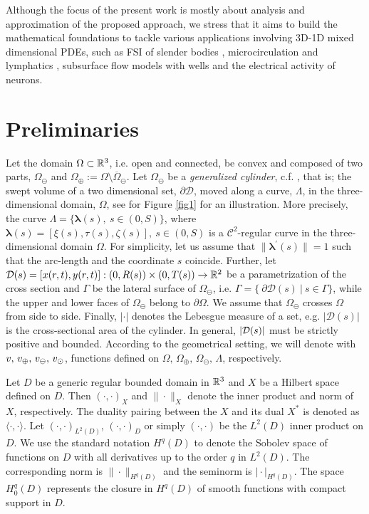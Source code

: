 \documentclass[r]{siamart171218}
\newcommand{\fede}[1]{{\color{green!55!blue}#1}}
\newcommand{\paoloold}[1]{{\color{black}#1}}
\begin{document}
\paoloold{Although the focus of the present work is mostly about analysis and approximation of the proposed approach, we stress that it aims to build the mathematical foundations to tackle various applications involving 3D-1D mixed dimensional PDEs, such as FSI of slender bodies \cite{Mori2019887}, microcirculation and lymphatics \cite{Possenti2019101,Vinje2019}, subsurface flow models with wells \cite{Cerroni2019} and the electrical activity of neurons.}

\section{Preliminaries}\label{sec:setting}
Let the domain $\Omega\subset \mathbb{R}^3 $\fede{, i.e. open and connected,} be convex and composed of two parts, 
$\Omega_{\ominus}$ and $\Omega_{\oplus}:=\Omega\setminus\overline{\Omega}_{\ominus}$. 
Let 
$\Omega_{\ominus}$ be a \emph{generalized cylinder}, c.f.  \cite{MR1940257}, 
that is; the swept volume of a two dimensional set, $\partial\mathcal{D}$, moved along a curve, $\Lambda$, in the three-dimensional domain, $\Omega$, see for Figure \ref{fig1} for an illustration. 
\fede{More precisely}, the curve 
$\Lambda = \{\boldsymbol \lambda(s), \ s\in(0,S)\}$,  where 
$\boldsymbol \lambda(s) = [\xi(s), \tau(s), \zeta(s)], \ s\in(0,S)$ is a $\mathcal{C}^2$-regular curve in the three-dimensional domain $\Omega$.
For simplicity, let us assume that $\|\boldsymbol \lambda^\prime(s)\|=1$ such that the arc-length and the coordinate $s$ coincide.
Further, let $\mathcal{D}(s) = [x(r,t),y(r,t)]: (0,R(s))\times(0,T(s)) \rightarrow \mathbb{R}^2$ be a parametrization of the cross section
and $\Gamma$ be the lateral surface of $\Omega_{\ominus}$, i.e.
$\Gamma=\{ \ \partial \mathcal{D}(s) \  | \ s \in \Gamma\}$,
while the upper and lower faces of $\Omega_{\ominus}$ belong to $\partial\Omega$. 
We assume that $\Omega_{\ominus}$ crosses $\Omega$ from side to side.
 \paoloold{Finally, $|\cdot|$ denotes the Lebesgue measure of a set, e.g. $|\mathcal{D}(s)|$ is the cross-sectional area of the cylinder. In general, $|\mathcal{D}(s)|$ must be strictly positive and bounded.}
According to the geometrical setting, we will denote with $v,\,v_\oplus,\,v_\ominus,\,v_{\odot}$,
functions defined on $\Omega,\,\Omega_{\oplus},\,\Omega_{\ominus},\,\Lambda$, respectively.

Let $D$ be a generic regular bounded domain in $\mathbb{R}^3$ and $X$ be a Hilbert space defined on $D$. Then  $(\cdot,\cdot)_X$ and $\|\cdot\|_X$ denote the inner product and norm of $X$, respectively.
The duality pairing between the $X$ and its dual $X^*$ is denoted as $\langle\cdot,\cdot\rangle$.
Let $(\cdot,\cdot)_{L^2(D)}$,  $(\cdot,\cdot)_D$ or simply $(\cdot,\cdot)$ be the $L^2(D)$ inner product on $D$.
We use the standard notation $H^q(D)$ to denote the Sobolev space of functions on $D$ with all derivatives up to the order $q$ in $L^2(D)$.
The corresponding norm is $\|\cdot\|_{H^q(D)}$ and the seminorm is $\vert\cdot\vert_{H^q(D)}$.
The space $H^q_0(D)$ represents the closure in $H^q(D)$ of smooth functions with compact support in $D$.
\end{document}
